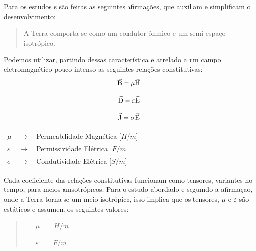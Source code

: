         Para os estudos \mt s são feitas as seguintes afirmações, que auxiliam e simplificam o desenvolvimento:
       
        \begin{quote}
            A Terra comporta-se como um condutor ôhmico e um semi-espaço isotrópico.
        \end{quote}
        
        Podemos utilizar, partindo dessas característica e atrelado a um campo eletromagnético pouco intenso as seguintes relações constitutivas:
        \begin{equation}
         \vec{\textrm{B}} = \mu \vec{\textrm{H}}
        \end{equation}
        
        \begin{equation}
         \vec{\textrm{D}} = \varepsilon \vec{\textrm{E}}
        \end{equation}
        
        \begin{equation}
         \vec{\textrm{J}} = \sigma \vec{\textrm{E}}
        \end{equation}

        {\footnotesize \noindent
            \begin{table}[H]
                \begin{tabular*}{1cm}{p{0.05cm}p{0.1cm}p{10cm}}
                    {\footnotesize $\mu$}          & {\footnotesize $\rightarrow$} & {\footnotesize Permeabilidade Magnética [$H/m$] }\\
                    {\footnotesize $\varepsilon$}  & {\footnotesize $\rightarrow$} & {\footnotesize Permissividade Elétrica [$F/m$] }\\
                    {\footnotesize $\sigma$}       & {\footnotesize $\rightarrow$} & {\footnotesize Condutividade Elétrica [$S/m$]} \\
                \end{tabular*}
            \end{table}}

        \noindent Cada coeficiente das relações constitutivas funcionam como tensores, variantes no tempo, para meios anisotrópicos. Para o estudo abordado e seguindo a afirmação, onde a Terra torna-se um meio isotrópico, isso implica que os tensores, $\mu$ e $\varepsilon$ são estáticos e assumem os seguintes valores:
        
        \begin{quote}
            \begin{enumerate}
                \item[$\mu$] $=$ $H/m$
                \item[$\varepsilon$] $=$ $F/m$
            \end{enumerate}
        \end{quote}
        

